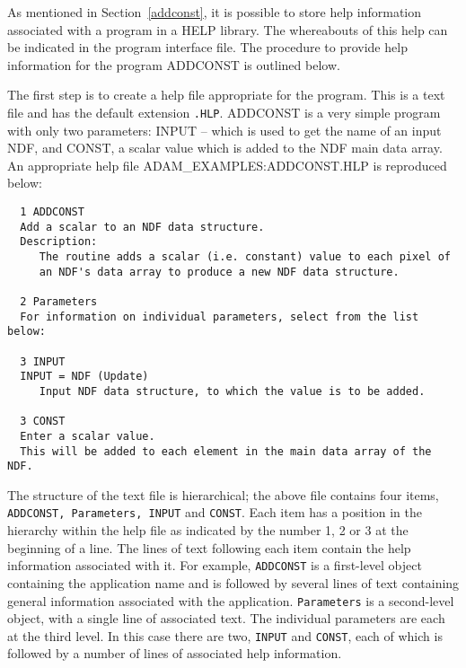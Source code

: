 As mentioned in Section~\ref{addconst}, it is possible to store help
information associated with a program in a HELP library.
The whereabouts of this help can be indicated in the program interface file.
The procedure to provide help information for the program 
ADDCONST is outlined below.

The first step is to create a help file appropriate for the  program.
This is a text file and has the default extension {\tt .HLP}.
ADDCONST is a very simple program with only two parameters: INPUT -- which 
is used to  get the name of an input NDF, and CONST,
a scalar value which is added to the NDF main data array.
An appropriate  help file ADAM\_EXAMPLES:ADDCONST.HLP is reproduced below:
\begin{verbatim}
  1 ADDCONST
  Add a scalar to an NDF data structure.
  Description:
     The routine adds a scalar (i.e. constant) value to each pixel of
     an NDF's data array to produce a new NDF data structure.

  2 Parameters
  For information on individual parameters, select from the list below:
 
  3 INPUT
  INPUT = NDF (Update)
     Input NDF data structure, to which the value is to be added.

  3 CONST
  Enter a scalar value.
  This will be added to each element in the main data array of the NDF.
\end{verbatim}
The structure of the text file is hierarchical;
the above file contains four items, {\tt ADDCONST, Parameters, INPUT} and 
{\tt CONST}.
Each item has a position in the hierarchy within the 
help file  as indicated by the number 1, 2 
or 3 at the beginning of a line.
The lines of text following each item contain the help information
associated with it.
For example, {\tt ADDCONST} is a first-level object containing the application name
and is followed by several lines of text containing general information 
associated with the application.
{\tt Parameters} is a second-level object, with a single line of associated text.
The individual parameters are each at the third level. 
In this case there are two, {\tt INPUT} and {\tt CONST}, each of which 
is followed by a number of lines of associated help
information.


